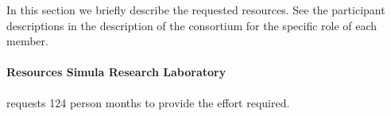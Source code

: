 
 In this section we briefly describe the requested resources. See the
 participant descriptions in the description of the consortium for the
 specific role of each member.

 \paragraph{Resources Simula Research Laboratory}



  requests 124 person months to provide the effort required.

